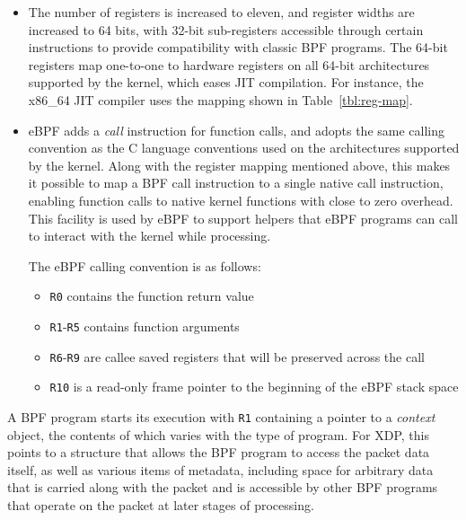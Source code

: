 \documentclass[10pt,sigconf]{acmart}
\begin{document}
\begin{itemize}
\item The number of registers is increased to eleven, and register widths are
increased to 64 bits, with 32-bit sub-registers accessible through certain
instructions to provide compatibility with classic BPF programs. The 64-bit
registers map one-to-one to hardware registers on all 64-bit architectures
supported by the kernel, which eases JIT compilation. For instance, the x86\_64
JIT compiler uses the mapping shown in Table \ref{tbl:reg-map}.

\item eBPF adds a \emph{call} instruction for function calls, and adopts the same calling
convention as the C language conventions used on the architectures supported
by the kernel. Along with the register mapping mentioned above, this makes it
possible to map a BPF call instruction to a single native call instruction,
enabling function calls to native kernel functions with close to zero
overhead. This facility is used by eBPF to support helpers that eBPF programs
can call to interact with the kernel while processing.

The eBPF calling convention is as follows:
\begin{itemize}
\item \texttt{R0} contains the function return value
\item \texttt{R1}-\texttt{R5} contains function arguments
\item \texttt{R6}-\texttt{R9} are callee saved registers that will be preserved across the call
\item \texttt{R10} is a read-only frame pointer to the beginning of the eBPF stack space
\end{itemize}
\end{itemize}


A BPF program starts its execution with \texttt{R1} containing a pointer to a \emph{context}
object, the contents of which varies with the type of program. For XDP, this
points to a structure that allows the BPF program to access the packet data
itself, as well as various items of metadata, including space for arbitrary data
that is carried along with the packet and is accessible by other BPF programs
that operate on the packet at later stages of processing.
\end{document}

